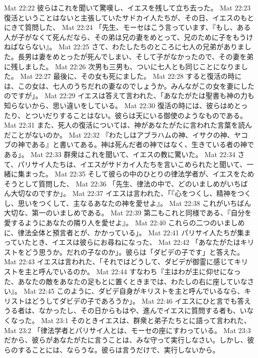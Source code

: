 Mat 22:22  彼らはこれを聞いて驚嘆し、イエスを残して立ち去った。
Mat 22:23  復活ということはないと主張していたサドカイ人たちが、その日、イエスのもとにきて質問した、
Mat 22:24  「先生、モーセはこう言っています、『もし、ある人が子がなくて死んだなら、その弟は兄の妻をめとって、兄のために子をもうけねばならない』。
Mat 22:25  さて、わたしたちのところに七人の兄弟がありました。長男は妻をめとったが死んでしまい、そして子がなかったので、その妻を弟に残しました。
Mat 22:26  次男も三男も、ついに七人とも同じことになりました。
Mat 22:27  最後に、その女も死にました。
Mat 22:28  すると復活の時には、この女は、七人のうちだれの妻なのでしょうか。みんながこの女を妻にしたのですが」。
Mat 22:29  イエスは答えて言われた、「あなたがたは聖書も神の力も知らないから、思い違いをしている。
Mat 22:30  復活の時には、彼らはめとったり、とついだりすることはない。彼らは天にいる御使のようなものである。
Mat 22:31  また、死人の復活については、神があなたがたに言われた言葉を読んだことがないのか。
Mat 22:32  『わたしはアブラハムの神、イサクの神、ヤコブの神である』と書いてある。神は死んだ者の神ではなく、生きている者の神である」。
Mat 22:33  群衆はこれを聞いて、イエスの教に驚いた。
Mat 22:34  さて、パリサイ人たちは、イエスがサドカイ人たちを言いこめられたと聞いて、一緒に集まった。
Mat 22:35  そして彼らの中のひとりの律法学者が、イエスをためそうとして質問した、
Mat 22:36  「先生、律法の中で、どのいましめがいちばん大切なのですか」。
Mat 22:37  イエスは言われた、「『心をつくし、精神をつくし、思いをつくして、主なるあなたの神を愛せよ』。
Mat 22:38  これがいちばん大切な、第一のいましめである。
Mat 22:39  第二もこれと同様である、『自分を愛するようにあなたの隣り人を愛せよ』。
Mat 22:40  これらの二つのいましめに、律法全体と預言者とが、かかっている」。
Mat 22:41  パリサイ人たちが集まっていたとき、イエスは彼らにお尋ねになった、
Mat 22:42  「あなたがたはキリストをどう思うか。だれの子なのか」。彼らは「ダビデの子です」と答えた。
Mat 22:43  イエスは言われた、「それではどうして、ダビデが御霊に感じてキリストを主と呼んでいるのか。
Mat 22:44  すなわち『主はわが主に仰せになった、あなたの敵をあなたの足もとに置くときまでは、わたしの右に座していなさい』。
Mat 22:45  このように、ダビデ自身がキリストを主と呼んでいるなら、キリストはどうしてダビデの子であろうか」。
Mat 22:46  イエスにひと言でも答えうる者は、なかったし、その日からもはや、進んでイエスに質問する者も、いなくなった。
Mat 23:1  そのときイエスは、群衆と弟子たちとに語って言われた、
Mat 23:2  「律法学者とパリサイ人とは、モーセの座にすわっている。
Mat 23:3  だから、彼らがあなたがたに言うことは、みな守って実行しなさい。しかし、彼らのすることには、ならうな。彼らは言うだけで、実行しないから。
